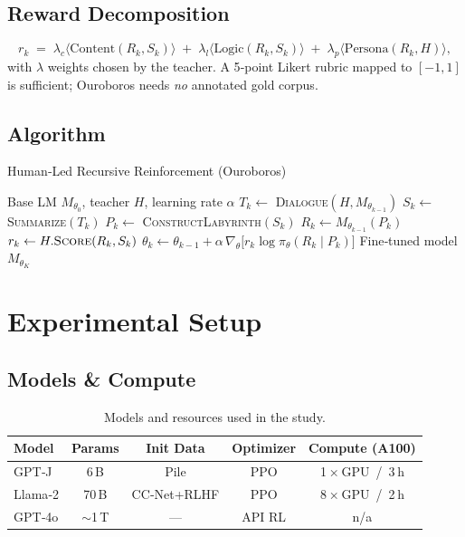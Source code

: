 \documentclass[11pt]{article}
\begin{document}
\subsection{Reward Decomposition}
\[
    r_k \;=\;
    \lambda_c \bigl\langle \text{Content}(R_k,S_k) \bigr\rangle\;+\;
    \lambda_l \bigl\langle \text{Logic}(R_k,S_k) \bigr\rangle\;+\;
    \lambda_p \bigl\langle \text{Persona}(R_k,H) \bigr\rangle,
\]
with $\lambda$ weights chosen by the teacher. A 5‑point Likert rubric mapped to $[-1,1]$ is sufficient; Ouroboros needs \emph{no} annotated gold corpus.

\subsection{Algorithm}
\begin{algorithm}[t]
\caption{Human‑Led Recursive Reinforcement (Ouroboros)}
\label{alg:ouroboros}
\begin{algorithmic}[1]
\REQUIRE Base LM $M_{\theta_0}$, teacher $H$, learning rate $\alpha$
  \STATE $T_k \leftarrow$ \textsc{Dialogue}$(H,M_{\theta_{k-1}})$
  \STATE $S_k \leftarrow$ \textsc{Summarize}$(T_k)$
  \STATE $P_k \leftarrow$ \textsc{ConstructLabyrinth}$(S_k)$
  \STATE $R_k \leftarrow M_{\theta_{k-1}}(P_k)$
  \STATE $r_k \leftarrow H.\textsc{Score}(R_k,S_k)$
  \STATE $\theta_k \leftarrow \theta_{k-1} + \alpha \,\nabla_\theta \bigl[r_k \log \pi_{\theta}(R_k\mid P_k)\bigr]$
\ENDFOR
\RETURN Fine‑tuned model $M_{\theta_K}$
\end{algorithmic}
\end{algorithm}

\section{Experimental Setup}
\subsection{Models \& Compute}
\begin{table}[h]
\centering
\begin{tabular}{lcccc}
\toprule
\textbf{Model} & \textbf{Params} & \textbf{Init Data} & \textbf{Optimizer} & \textbf{Compute (A100)}\\
\midrule
GPT‑J          & 6 B  & Pile      & PPO & 1 × GPU / 3 h\\
Llama‑2        & 70 B & CC‑Net+RLHF & PPO & 8 × GPU / 2 h\\
GPT‑4o        & $\sim$1 T & --- & API RL & n/a\\
\bottomrule
\end{tabular}
\caption{Models and resources used in the study.}
\label{tab:models}
\end{table}
\end{document}
